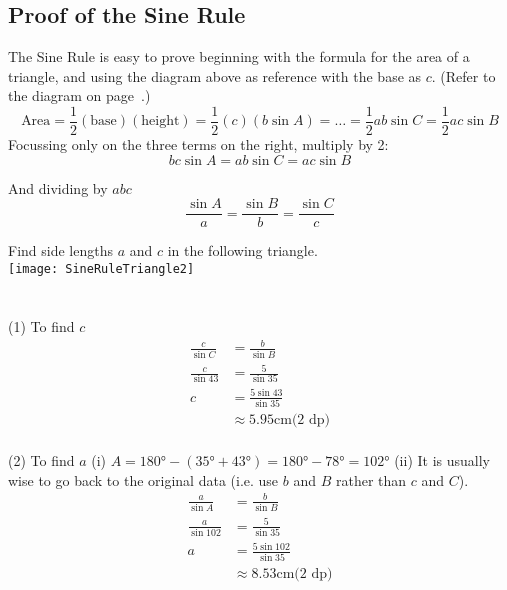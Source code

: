 \subsection*{Proof of the Sine Rule}
The Sine Rule is easy to prove beginning with the formula for the area of a triangle, and using the diagram above as reference with the base as $c$. (Refer to the diagram on page~\pageref{fig:triangleArea}.)
\begin{equation*}\text{Area} =\frac{1}{2}(\text{base})(\text{height})=\frac{1}{2} (c)(b\sin A)=\dots=\frac{1}{2}ab\sin C=\frac{1}{2}ac\sin B
\end{equation*}
Focussing only on the three terms on the right, multiply by 2:
\begin{equation*}b c \sin  A=ab\sin C=ac\sin B
\end{equation*}

And dividing by $a b c$
\begin{equation*}\frac{\sin A}{a}=\frac{\sin B}{b}=\frac{\sin C}{c}
\end{equation*}
\clearpage
\begin{multicols}{2}
\example Find side lengths $a$ and $c$ in the following triangle.\\
\texttt{[image: SineRuleTriangle2]}\\
$\phantom{1}$\\
$\phantom{1}$\\
\solution \medskip\\(1) To find $c$
\begin{align*}\frac{c}{\sin  C} &  = \frac{b}{\sin  B} \\
\frac{c}{\sin  43 } &  = \frac{5}{\sin  35 } \\
c &  = \frac{5 \sin  43 }{\sin  35 } \\
&  \approx   5.95 \mbox{cm}\text{(2 dp)}\end{align*} \\
(2) To find $a$ (i) $A =\ang{180}  -(\ang{35}  +\ang{43} ) =\ang{180}  -\ang{78}  =\ang{102}$ (ii) It is usually wise to go back to the original data (i.e. use $b$ and $B$ rather than $c$ and $C$).
\begin{align*}\frac{a}{\sin  A} &  = \frac{b}{\sin  B} \\
\frac{a}{\sin  102 } &  = \frac{5}{\sin  35 } \\
a &  = \frac{5 \sin  102 }{\sin  35 } \\
&  \approx   8.53 \mbox{cm}\text{(2 dp)}\end{align*}
\end{multicols}

